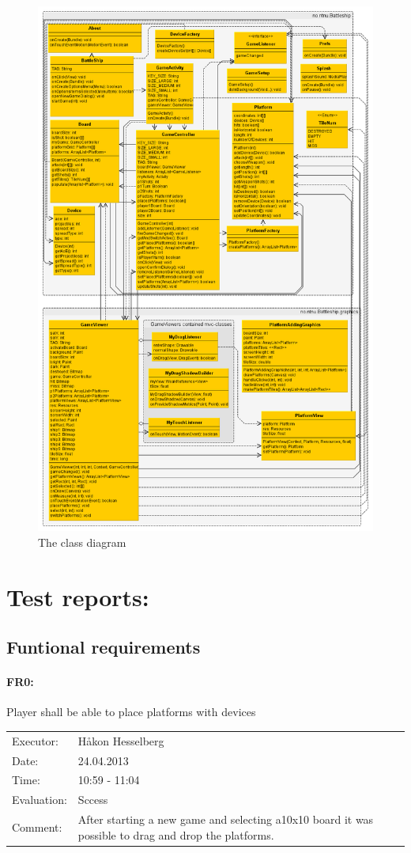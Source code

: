 \documentclass[12pt, a4paper]{article}
\begin{document}
\begin{figure}[h!]
    \centering
    \includegraphics[width=.9\textwidth]{classdiagram} 
    \caption{The class diagram}
    \label{fig:classdiagram}
\end{figure}

\section{Test reports:}
\subsection{Funtional requirements}
\paragraph{FR0:} Player shall be able to place platforms with devices\\
\begin{tabular}{  p{}  p{} }
	Executor: & Håkon Hesselberg  \\
	Date: & 24.04.2013 \\
	Time: & 10:59 - 11:04  \\
	Evaluation: & Sccess \\
	Comment: & After starting a new game and selecting a10x10 board it was
possible to drag and drop the platforms. \\
\end{tabular}
\end{document}
